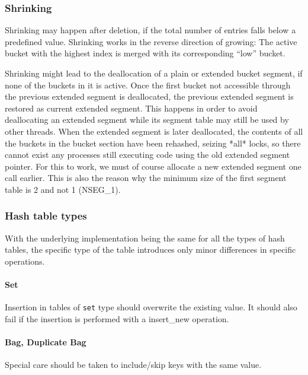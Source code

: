 \documentclass[aps,pre,preprint,nofootinbib]{revtex4}
\begin{document}
\subsubsection{Shrinking}

Shrinking may happen after deletion, if the total number of entries falls below a predefined value.
Shrinking works in the reverse direction of growing:
The active bucket with the highest index is merged with its corresponding ``low'' bucket.

Shrinking might lead to the deallocation of a plain or extended bucket segment, if none of the buckets in it is active.
Once the first bucket not accessible through the previous extended segment is deallocated, the previous extended segment is restored as current extended segment.
This happens in order to avoid deallocating an extended segment while its segment table may still be used by other threads.
When the extended segment is later deallocated, the contents of all the buckets in the bucket section have been rehashed, seizing *all* locks, so there cannot exist any processes still executing code using the old extended segment pointer.
For this to work, we must of course allocate a new extended segment one call earlier.
This is also the reason why the minimum size of the first segment table is 2 and not 1 (NSEG\_1).

\subsubsection{Hash table types}     %

With the underlying implementation being the same for all the types of hash tables, the specific type of the table introduces only minor differences in specific operations.

\paragraph{Set}

Insertion in tables of \verb|set| type should overwrite the existing value.
It should also fail if the insertion is performed with a insert\_new operation.

\paragraph{Bag, Duplicate Bag}

Special care should be taken to include/skip keys with the same value.
\end{document}
